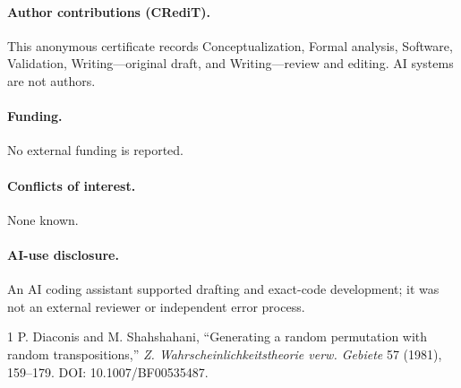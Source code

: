 \documentclass[9pt]{extarticle}
\begin{document}
\paragraph{Author contributions (CRediT).} This anonymous certificate records
Conceptualization, Formal analysis, Software, Validation, Writing---original
draft, and Writing---review and editing. AI systems are not authors.
\paragraph{Funding.} No external funding is reported.
\paragraph{Conflicts of interest.} None known.
\paragraph{AI-use disclosure.} An AI coding assistant supported drafting and
exact-code development; it was not an external reviewer or independent error
process.

\begin{thebibliography}{1}
 P. Diaconis and M. Shahshahani,
``Generating a random permutation with random transpositions,''
\emph{Z. Wahrscheinlichkeitstheorie verw. Gebiete} 57 (1981), 159--179.
DOI: 10.1007/BF00535487.
\end{thebibliography}
\end{document}
